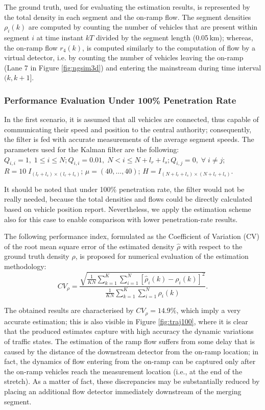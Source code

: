 \documentclass[titlepage,oneside,fleqn,12pt]{article}
\begin{document}
The ground truth, used for evaluating the estimation results, is represented by the total density in each segment and the on-ramp flow. The segment densities $\rho_i(k)$ are computed by counting the number of vehicles that are present within segment $i$ at time instant $kT$ divided by the segment length (0.05\,km); whereas, the on-ramp flow $r_4(k)$, is computed similarly to the computation of flow by a virtual detector, i.e. by counting the number of vehicles leaving the on-ramp (Lane 7 in Figure \ref{fig:ngsim3d}) and entering the mainstream during time interval $(k,k+1]$.


\subsubsection{Performance Evaluation Under 100\% Penetration Rate}

In the first scenario, it is assumed that all vehicles are connected, thus capable of communicating their speed and position to the central authority; consequently, the filter is fed with accurate measurements of the average segment speeds. The parameters used for the Kalman filter are the following: $ Q_{i,i}=1, \; 1 \leq i \leq N; Q_{i,i}=0.01, \; N < i \leq N+l_r+l_s; Q_{i,j}=0, \; \forall \; i \neq j$;  $R=10 \; I_{ \left( l_r+l_s \right) \times \left( l_r+l_s \right) }$; $\mu = \left(40,\ldots,40\right)$; $H=I_{ \left(N+l_r+l_s\right) \times \left(N+l_r+l_s\right) }$.

It should be noted that under 100\% penetration rate, the filter would not be really needed, because the total densities and flows could be directly calculated based on vehicle position report. Nevertheless, we apply the estimation scheme also for this case to enable comparison with lower penetration-rate results.

The following performance index, formulated as the Coefficient of Variation (CV) of the root mean square error of the estimated density $\hat{\rho}$ with respect to the ground truth density $\rho$, is proposed for numerical evaluation of the estimation methodology:
\begin{equation} \label{eq:perfIndexDens}
CV_\rho = \frac{\sqrt{ \frac{1}{KN} \sum_{k=1}^{K} \sum_{i=1}^{N} \left[ \hat{\rho}_i(k) - \rho_i(k) \right]^2}}{\frac{1}{KN} \sum_{k=1}^{K} \sum_{i=1}^{N} \rho_i(k)}.
\end{equation}

The obtained results are characterised by $CV_\rho=14.9\%$, which imply a very accurate estimation; this is also visible in Figure \ref{fig:traj100}, where it is clear that the produced estimates capture with high accuracy the dynamic variations of traffic states.
The estimation of the ramp flow suffers from some delay that is caused by the distance of the downstream detector from the on-ramp location; in fact, the dynamics of flow entering from the on-ramp can be captured only after the on-ramp vehicles reach the measurement location (i.e., at the end of the stretch). As a matter of fact, these discrepancies may be substantially reduced by placing an additional flow detector immediately downstream of the merging segment.
\end{document}
